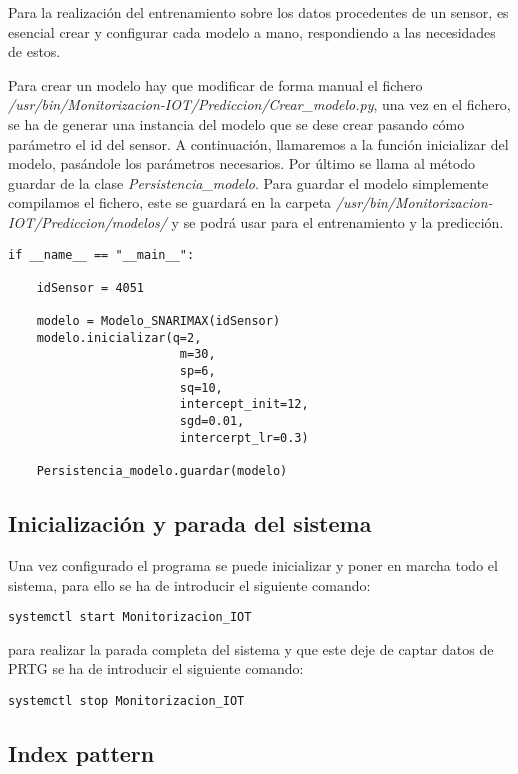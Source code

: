 Para la realización del entrenamiento sobre los datos procedentes de un sensor, es esencial crear y configurar cada modelo a mano, respondiendo a las necesidades de estos.

Para crear un modelo hay que modificar de forma manual el fichero \textit{/usr/bin/Monitorizacion-IOT/Prediccion/Crear\_modelo.py}, una vez en el fichero, se ha de generar una instancia del modelo que se dese crear pasando cómo parámetro el id del sensor. A continuación, llamaremos a la función inicializar del modelo, pasándole los parámetros necesarios. Por último se llama al método guardar de la clase \textit{Persistencia\_modelo}. Para guardar el modelo simplemente compilamos el fichero, este se guardará en la carpeta \textit{/usr/bin/Monitorizacion-IOT/Prediccion/modelos/} y se podrá usar para el entrenamiento y la predicción.

\begin{verbatim}
if __name__ == "__main__":

    idSensor = 4051

    modelo = Modelo_SNARIMAX(idSensor)
    modelo.inicializar(q=2,
                        m=30,
                        sp=6,
                        sq=10,
                        intercept_init=12,
                        sgd=0.01, 
                        intercerpt_lr=0.3)

    Persistencia_modelo.guardar(modelo)

\end{verbatim}

\subsection{Inicialización y parada del sistema}

Una vez configurado el programa se puede inicializar y poner en marcha todo el sistema, para ello se ha de introducir el siguiente comando:

\begin{lstlisting}[frame=single]  
systemctl start Monitorizacion_IOT
\end{lstlisting}

para realizar la parada completa del sistema y que este deje de captar datos de PRTG se ha de introducir el siguiente comando:

\begin{lstlisting}[frame=single]  
systemctl stop Monitorizacion_IOT
\end{lstlisting}


\subsection{Index pattern}

